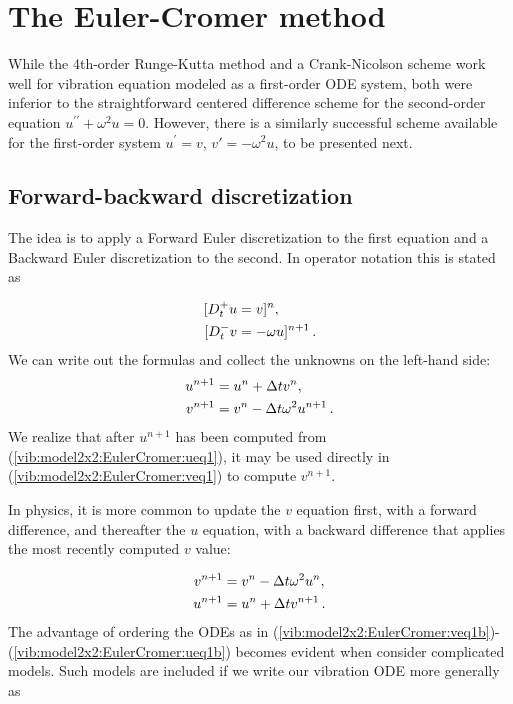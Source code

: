 \documentclass[%
oneside,                 %
final,                   %
10pt]{article}
\begin{document}
\section{The Euler-Cromer method}
\label{vib:model2x2:EulerCromer}

While the 4th-order Runge-Kutta method and a
Crank-Nicolson scheme work well for vibration equation modeled as a
first-order ODE system,
both were inferior to the straightforward centered
difference scheme for the second-order equation
$u^{\prime\prime}+\omega^2u=0$. However, there is a similarly successful scheme
available for the first-order system $u^{\prime}=v$, $v'=-\omega^2u$, to be
presented next.


\subsection{Forward-backward discretization}

The idea is to apply a Forward Euler discretization to the first
equation and a Backward Euler discretization to the second. In operator
notation this is stated as

\begin{align}
\lbrack D_t^+u &= v\rbrack^n,\\ 
\lbrack D_t^-v &= -\omega u\rbrack^{n+1}
\tp
\end{align}
We can write out the formulas and collect the unknowns on the left-hand side:
\begin{align}
u^{n+1} &= u^n + \Delta t v^n,
\label{vib:model2x2:EulerCromer:ueq1}\\ 
v^{n+1} &= v^n -\Delta t \omega^2u^{n+1}
\label{vib:model2x2:EulerCromer:veq1}
\tp
\end{align}
We realize that after $u^{n+1}$ has been computed from
(\ref{vib:model2x2:EulerCromer:ueq1}), it may be used directly
in
(\ref{vib:model2x2:EulerCromer:veq1}) to compute $v^{n+1}$.

In physics, it is more common to update the $v$ equation first, with
a forward difference, and thereafter the $u$ equation, with a backward
difference that applies the most recently computed $v$ value:

\begin{align}
v^{n+1} &= v^n -\Delta t \omega^2u^{n},
\label{vib:model2x2:EulerCromer:veq1b}\\ 
u^{n+1} &= u^n + \Delta t v^{n+1}\tp
\label{vib:model2x2:EulerCromer:ueq1b}
\end{align}
The advantage of ordering the ODEs as in
(\ref{vib:model2x2:EulerCromer:veq1b})-(\ref{vib:model2x2:EulerCromer:ueq1b})
becomes evident
when consider complicated models. Such models are included if
we write our vibration ODE more generally as
\end{document}
